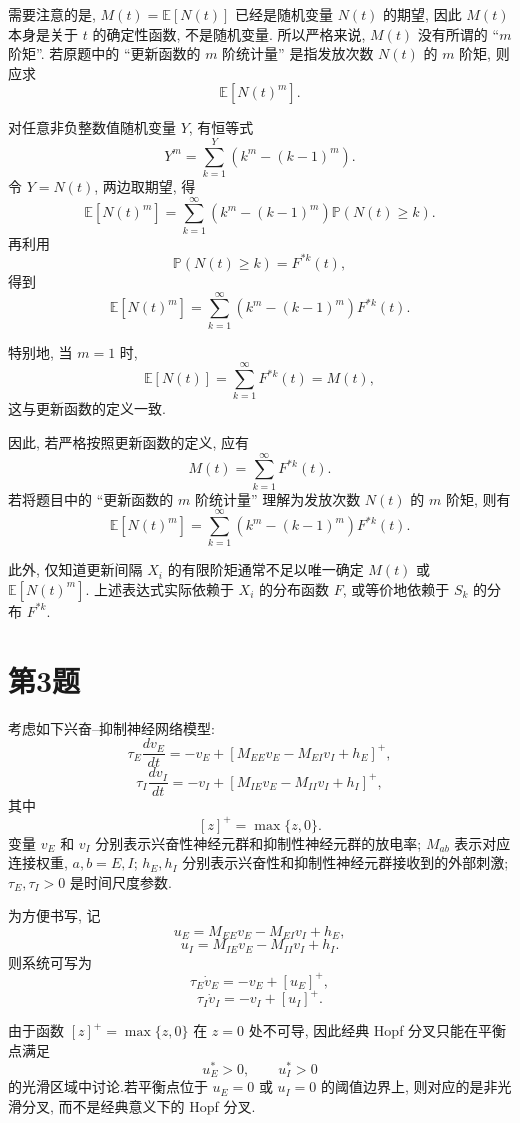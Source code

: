 ﻿\documentclass[UTF8,  zihao=-4]{ctexart}
\begin{document}
需要注意的是,  \(M(t)=\mathbb E[N(t)]\) 已经是随机变量 \(N(t)\) 的期望, 
因此 \(M(t)\) 本身是关于 \(t\) 的确定性函数,  不是随机变量.
所以严格来说,  \(M(t)\) 没有所谓的 ``\(m\) 阶矩''. 若原题中的
``更新函数的 \(m\) 阶统计量'' 是指发放次数 \(N(t)\) 的 \(m\) 阶矩,  则应求
\[
    \mathbb E[N(t)^m].
\]

对任意非负整数值随机变量 \(Y\),  有恒等式
\[
    Y^m
    =
    \sum_{k=1}^{Y}\left(k^m-(k-1)^m\right).
\]
令 \(Y=N(t)\),  两边取期望,  得
\[
    \mathbb E[N(t)^m]
    =
    \sum_{k=1}^{\infty}
    \left(k^m-(k-1)^m\right)
    \mathbb P(N(t)\geq k).
\]
再利用
\[
    \mathbb P(N(t)\geq k)=F^{*k}(t), 
\]
得到
\[
    \boxed{
    \mathbb E[N(t)^m]
    =
    \sum_{k=1}^{\infty}
    \left(k^m-(k-1)^m\right)F^{*k}(t)
    }.
\]

特别地,  当 \(m=1\) 时, 
\[
    \mathbb E[N(t)]
    =
    \sum_{k=1}^{\infty}F^{*k}(t)
    =
    M(t), 
\]
这与更新函数的定义一致.

因此,  若严格按照更新函数的定义,  应有
\[
    \boxed{
    M(t)=\sum_{k=1}^{\infty}F^{*k}(t)
    }.
\]
若将题目中的 ``更新函数的 \(m\) 阶统计量'' 理解为发放次数 \(N(t)\) 的
\(m\) 阶矩,  则有
\[
    \boxed{
    \mathbb E[N(t)^m]
    =
    \sum_{k=1}^{\infty}
    \left(k^m-(k-1)^m\right)F^{*k}(t)
    }.
\]

此外,  仅知道更新间隔 \(X_i\) 的有限阶矩通常不足以唯一确定
\(M(t)\) 或 \(\mathbb E[N(t)^m]\). 上述表达式实际依赖于 \(X_i\) 的分布函数
\(F\),  或等价地依赖于 \(S_k\) 的分布 \(F^{*k}\).
\fi

\iffalse
\section{第3题}

考虑如下兴奋--抑制神经网络模型:
\[
\tau_E\frac{dv_E}{dt}
=
-v_E+\left[M_{EE}v_E-M_{EI}v_I+h_E\right]^+,  
\]
\[
\tau_I\frac{dv_I}{dt}
=
-v_I+\left[M_{IE}v_E-M_{II}v_I+h_I\right]^+,  
\]
其中
\[
[z]^+=\max\{z,  0\}.
\]
变量 \(v_E\) 和 \(v_I\) 分别表示兴奋性神经元群和抑制性神经元群的放电率;
\(M_{ab}\) 表示对应连接权重,  \(a,  b=E,  I\);
\(h_E,  h_I\) 分别表示兴奋性和抑制性神经元群接收到的外部刺激;
\(\tau_E,  \tau_I>0\) 是时间尺度参数.

为方便书写,  记
\[
u_E=M_{EE}v_E-M_{EI}v_I+h_E,  
\]
\[
u_I=M_{IE}v_E-M_{II}v_I+h_I.
\]
则系统可写为
\[
\tau_E\dot v_E=-v_E+[u_E]^+,  
\]
\[
\tau_I\dot v_I=-v_I+[u_I]^+.
\]

由于函数 \([z]^+=\max\{z,  0\}\) 在 \(z=0\) 处不可导,  因此经典 Hopf 分叉只能在平衡点满足
\[
u_E^*>0,  \qquad u_I^*>0
\]
的光滑区域中讨论.若平衡点位于 \(u_E=0\) 或 \(u_I=0\) 的阈值边界上,  则对应的是非光滑分叉,  而不是经典意义下的 Hopf 分叉.
\end{document}
